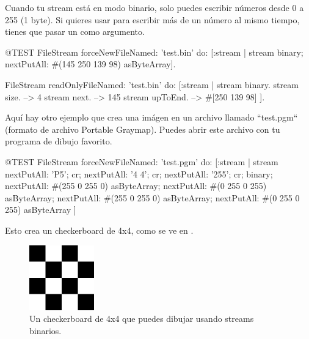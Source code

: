 \documentclass[a4paper,10pt,twoside]{book}
\begin{document}
{%
Cuando tu stream est\'a en modo binario, solo puedes escribir n\'umeros
desde 0 a 255 (1 byte). Si quieres usar  para escribir
m\'as de un n\'umero al mismo tiempo, tienes que pasar un  como argumento. 
 
\begin{code}{@TEST}
FileStream
  forceNewFileNamed: 'test.bin'
  do: [:stream |
          stream
            binary;
            nextPutAll: #(145 250 139 98) asByteArray].

FileStream
  readOnlyFileNamed: 'test.bin'
  do: [:stream |
          stream binary.
          stream size.         --> 4
          stream next.         --> 145
          stream upToEnd. --> #[250 139 98]
      ].
\end{code}

Aqu\'i hay otro ejemplo que crea una im\'agen en un archivo llamado
``test.pgm`` (formato de archivo Portable Graymap). Puedes abrir este archivo con tu programa de dibujo favorito.

\begin{code}{@TEST}
FileStream
  forceNewFileNamed: 'test.pgm' 
  do: [:stream |
	stream
		nextPutAll: 'P5'; cr;
		nextPutAll: '4 4'; cr;
		nextPutAll: '255'; cr;
		binary;
		nextPutAll: #(255 0 255 0) asByteArray;
		nextPutAll: #(0 255 0 255) asByteArray;
		nextPutAll: #(255 0 255 0) asByteArray;
		nextPutAll: #(0 255 0 255) asByteArray
	]
\end{code}

Esto crea un checkerboard de 4x4, como se ve en .

\begin{figure}[!ht]
\centerline{\includegraphics[width=0.25\textwidth]{checkerboard4x4}}
\caption{Un checkerboard de 4x4 que puedes dibujar usando streams binarios.}
\vspace{.2in}
\end{figure}

}
\end{document}
